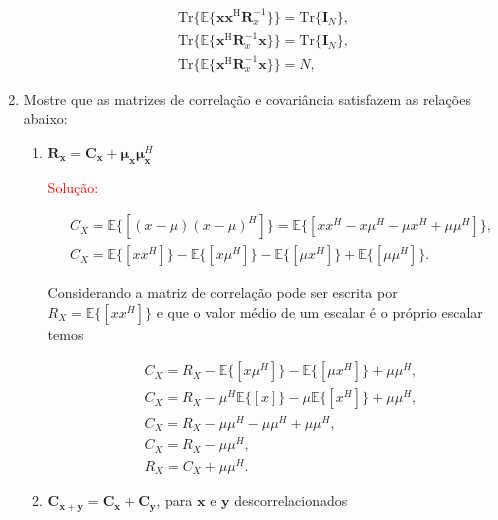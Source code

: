 \documentclass[a4paper,10pt]{article}
\begin{document}
\begin{enumerate}
				\begin{align}
					\text{Tr}\{\mathbb{E}\{\mathbf{x} \mathbf{x}^{\text{H}}\mathbf{R}^{-1}_{x}\}\} = \text{Tr}\{\mathbf{I}_{N}\}, \\
					\text{Tr}\{\mathbb{E}\{\mathbf{x}^{\text{H}}\mathbf{R}^{-1}_{x} \mathbf{x}\}\} = \text{Tr}\{\mathbf{I}_{N}\}, \\
					\text{Tr}\{\mathbb{E}\{\mathbf{x}^{\text{H}}\mathbf{R}^{-1}_{x} \mathbf{x}\}\} = N,
				\end{align}
			
			\item Mostre que as matrizes de correlação e covariância satisfazem as relações abaixo:
				
				\begin{enumerate}
					
					\item $\mathbf{R}_\mathbf{x} = \mathbf{C}_\mathbf{x} + {\mathbf{\mu}}_{\mathbf{x}}{\mathbf{\mu}}_{\mathbf{x}}^H$
					
						\textcolor{red}{Solução:}
						
						\begin{align}
							&C_{X} = \mathbb{E}\{[(x - \mu)(x - \mu)^{H}]\} = \mathbb{E}\{[xx^{H} -x\mu^{H} - \mu x^{H} + \mu \mu^{H}]\}, \\
							&C_{X} = \mathbb{E}\{[xx^{H}]\} -\mathbb{E}\{[x\mu^{H}]\} - \mathbb{E}\{[\mu x^{H}]\} + \mathbb{E}\{[\mu \mu^{H}]\}.
						\end{align}
						
						
						Considerando a matriz de correlação pode ser escrita por $R_{X} = \mathbb{E}\{[xx^{H}]\}$ e que o valor médio de um escalar é o próprio escalar temos
						
						\begin{align}
							&C_{X} = R_{X} - \mathbb{E}\{[x\mu^{H}]\} - \mathbb{E}\{[\mu x^{H}]\} + \mu \mu^{H}, \\
							&C_{X} = R_{X} - \mu^{H}\mathbb{E}\{[x]\} - \mu \mathbb{E}\{[x^{H}]\} + \mu \mu^{H}, \\
							&C_{X} = R_{X} - \mu \mu^{H} - \mu \mu^{H} + \mu \mu^{H}, \\
							&C_{X} = R_{X} - \mu \mu^{H}, \\
							&R_{X} = C_{X} + \mu \mu^{H}.
						\end{align}
					
					\item $\mathbf{C}_{\mathbf{x} + \mathbf{y}} = \mathbf{C}_{\mathbf{x}} +
					\mathbf{C}_{\mathbf{y}}$, para $\mathbf{x}$ e $\mathbf{y}$ descorrelacionados
					

\end{enumerate}
\end{enumerate}
\end{document}

